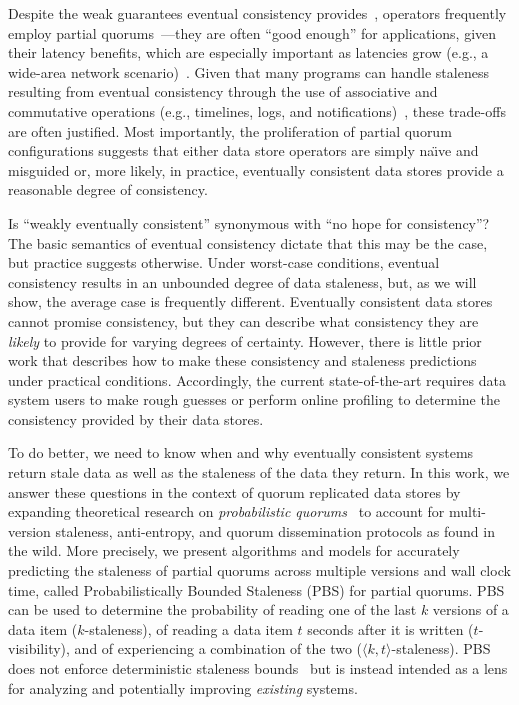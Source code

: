 \documentclass{vldb}
\begin{document}
Despite the weak guarantees eventual
consistency provides~\cite{hamilton-cap, cops, walter}, operators frequently
employ partial quorums~\cite{cassandra, cassandra-docs,
  cassandradefault,feinbergpc,reddit, outbrain, maxperfblog}---they
are often ``good enough'' for applications, given their latency
benefits, which are especially important as latencies grow (e.g., a
wide-area network scenario)~\cite{abadilatconsist, feinbergpc}.  Given
that many programs can handle staleness resulting from eventual
consistency through the use of associative and commutative operations
(e.g., timelines, logs, and notifications)~\cite{calm, helland}, these
trade-offs are often justified.  Most importantly, the proliferation
of partial quorum configurations suggests that either data store
operators are simply na\"{\i}ve and misguided or, more likely, in
practice, eventually consistent data stores provide a reasonable
degree of consistency.

Is ``weakly eventually consistent'' synonymous with ``no hope for
consistency''? The basic semantics of eventual consistency dictate
that this may be the case, but practice suggests otherwise. Under
worst-case conditions, eventual consistency results in an unbounded
degree of data staleness, but, as we will show, the average case is
frequently different.  Eventually consistent data stores cannot
promise consistency, but they can describe what consistency they are
\textit{likely} to provide for varying degrees of certainty.  However,
there is little prior work that describes how to make these
consistency and staleness predictions under practical conditions.
Accordingly, the current state-of-the-art requires data system users
to make rough guesses or perform online profiling to determine the
consistency provided by their data stores.

To do better, we need to know when and why eventually consistent
systems return stale data as well as the staleness of the data they
return.  In this work, we answer these questions in the context of
quorum replicated data stores by expanding theoretical research on
\textit{probabilistic quorums}~\cite{prob-quorum, quorum-overview} to
account for multi-version staleness, anti-entropy, and quorum
dissemination protocols as found in the wild.  More precisely, we
present algorithms and models for accurately predicting the staleness
of partial quorums across multiple versions and wall clock time,
called Probabilistically Bounded Staleness (PBS) for partial
quorums. PBS can be used to determine the probability of reading one
of the last $k$ versions of a data item ($k$-staleness), of reading a
data item $t$ seconds after it is written ($t$-visibility), and of
experiencing a combination of the two ($\langle k, t
\rangle$-staleness). PBS does not enforce deterministic staleness
bounds~\cite{ aqua, trapp,vahdat-article, vahdat-bounded, frac} but is
instead intended as a lens for analyzing and potentially improving
\textit{existing} systems.
\end{document}
